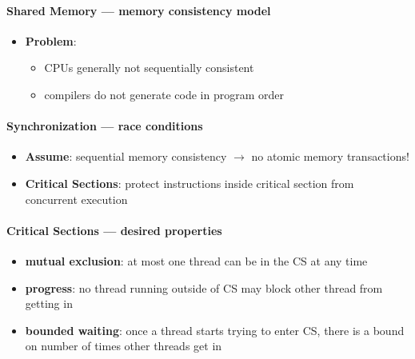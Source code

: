 \paragraph{Shared Memory --- memory consistency model}
\begin{itemize}
  \item \textbf{Problem}:
  \begin{itemize}
    \item CPUs generally not sequentially consistent
    \item compilers do not generate code in program order
  \end{itemize}
\end{itemize}

\paragraph{Synchronization --- race conditions}
\begin{itemize}
  \item \textbf{Assume}: sequential memory consistency \( \to \) no atomic memory transactions!
  \item \textbf{Critical Sections}: protect instructions inside critical section from concurrent execution
\end{itemize}

\paragraph{Critical Sections --- desired properties}
\begin{itemize}
  \item \textbf{mutual exclusion}: at most one thread can be in the CS at any time
  \item \textbf{progress}: no thread running outside of CS may block other thread from getting in
  \item \textbf{bounded waiting}: once a thread starts trying to enter CS, there is a bound on number of times other threads get in
\end{itemize}

